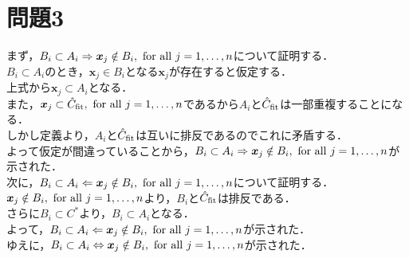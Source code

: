 \section*{問題3}
\noindent
まず，$B_i\subset A_i\Rightarrow \bm{x}_j\notin B_i,\ {\rm for\ all}\ j=1,\ldots,n$について証明する．\\
$B_i\subset A_i$のとき，$\bm{x}_j\in B_i$となる$\bm{x}_j$が存在すると仮定する．\\
上式から$\bm{x}_j\subset A_i$となる．\\
また，$\bm{x}_j\subset \hat{C}_{\rm fit},\ {\rm for\ all}\ j=1,\ldots,n$であるから$A_i$と$\hat{C}_{\rm fit}$は一部重複することになる．\\
しかし定義より，$A_i$と$\hat{C}_{\rm fit}$は互いに排反であるのでこれに矛盾する．\\
よって仮定が間違っていることから，$B_i\subset A_i\Rightarrow \bm{x}_j\notin B_i,\ {\rm for\ all}\ j=1,\ldots,n$が示された．\\
次に，$B_i\subset A_i\Leftarrow \bm{x}_j\notin B_i,\ {\rm for\ all}\ j=1,\ldots,n$について証明する．\\
$\bm{x}_j\notin B_i,\ {\rm for\ all}\ j=1,\ldots,n$より，$B_i$と$\hat{C}_{\rm fit}$は排反である．\\
さらに$B_i\subset C^*$より，$B_i\subset A_i$となる．\\
よって，$B_i\subset A_i\Leftarrow \bm{x}_j\notin B_i,\ {\rm for\ all}\ j=1,\ldots,n$が示された．\\
ゆえに，$B_i\subset A_i\Leftrightarrow \bm{x}_j\notin B_i,\ {\rm for\ all}\ j=1,\ldots,n$が示された．
